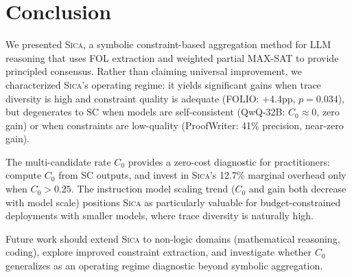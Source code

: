 \documentclass[11pt,a4paper]{article}
\newcommand{\sica}{\textsc{Sica}}
\begin{document}
\section{Conclusion}
\label{sec:conclusion}

We presented \sica{}, a symbolic constraint-based aggregation method for LLM reasoning that uses FOL extraction and weighted partial MAX-SAT to provide principled consensus.
Rather than claiming universal improvement, we characterized \sica{}'s operating regime: it yields significant gains when trace diversity is high and constraint quality is adequate (FOLIO: +4.4pp, $p{=}0.034$), but degenerates to SC when models are self-consistent (QwQ-32B: $C_0 \approx 0$, zero gain) or when constraints are low-quality (ProofWriter: 41\% precision, near-zero gain).

The multi-candidate rate $C_0$ provides a zero-cost diagnostic for practitioners: compute $C_0$ from SC outputs, and invest in \sica{}'s 12.7\% marginal overhead only when $C_0 > 0.25$.
The instruction model scaling trend ($C_0$ and gain both decrease with model scale) positions \sica{} as particularly valuable for budget-constrained deployments with smaller models, where trace diversity is naturally high.

Future work should extend \sica{} to non-logic domains (mathematical reasoning, coding), explore improved constraint extraction, and investigate whether $C_0$ generalizes as an operating regime diagnostic beyond symbolic aggregation.
\end{document}
